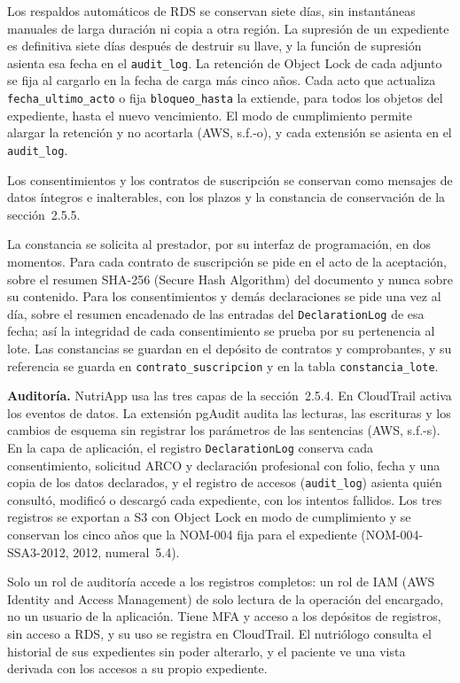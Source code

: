 \documentclass[12pt, a4paper]{article}
\begin{document}
Los respaldos automáticos de RDS se conservan siete días, sin
instantáneas manuales de larga duración ni copia a otra región. La supresión de un expediente es definitiva siete días después de
destruir su llave, y la función de supresión asienta esa fecha en el
\texttt{audit\_log}. La retención de Object Lock de cada adjunto se fija
al cargarlo en la fecha de carga más cinco años. Cada acto que actualiza
\texttt{fecha\_ultimo\_acto} o fija \texttt{bloqueo\_hasta} la extiende,
para todos los objetos del expediente, hasta el nuevo vencimiento. El
modo de cumplimiento permite alargar la retención y no acortarla (AWS,
s.f.-o), y cada extensión se asienta en el \texttt{audit\_log}.

Los consentimientos y los contratos de suscripción se conservan como
mensajes de datos íntegros e inalterables, con los plazos y la constancia de conservación de la sección~2.5.5.

La constancia se solicita al prestador, por su interfaz de programación,
en dos momentos. Para cada contrato de suscripción se pide en el acto de
la aceptación, sobre el resumen SHA-256 (Secure Hash Algorithm) del documento y nunca sobre su
contenido. Para los consentimientos y demás declaraciones se pide una
vez al día, sobre el resumen encadenado de las entradas del
\texttt{DeclarationLog} de esa fecha; así la integridad de cada
consentimiento se prueba por su pertenencia al lote. Las constancias se
guardan en el depósito de contratos y comprobantes, y su referencia se
guarda en \texttt{contrato\_suscripcion} y en la tabla
\texttt{constancia\_lote}.

\textbf{Auditoría.} NutriApp usa las tres capas de
la sección~2.5.4. En CloudTrail activa los eventos de datos. La extensión pgAudit audita las lecturas,
las escrituras y los cambios de esquema sin registrar los parámetros de
las sentencias (AWS, s.f.-s). En la capa de aplicación, el registro \texttt{DeclarationLog} conserva cada consentimiento, solicitud ARCO y declaración profesional con folio, fecha y una copia de los datos declarados, y el registro de accesos (\texttt{audit\_log}) asienta quién consultó, modificó o descargó cada expediente, con los intentos fallidos. Los tres registros se exportan a S3 con Object Lock en modo de cumplimiento y se conservan los cinco años que la NOM-004 fija para el expediente (NOM-004-SSA3-2012, 2012, numeral~5.4).

Solo un rol de auditoría accede a los registros completos: un rol de IAM (AWS Identity and Access Management) de solo lectura de la operación del encargado, no un usuario de la aplicación. Tiene MFA y acceso a los depósitos de registros, sin acceso a RDS, y su uso se registra en CloudTrail. El nutriólogo consulta el historial de sus expedientes sin poder alterarlo, y el paciente ve una vista derivada con los accesos a su propio expediente.
\end{document}

